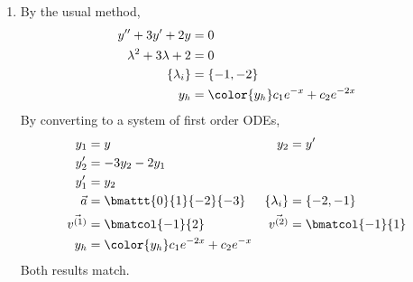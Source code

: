 \begin{enumerate}
    \item By the usual method,
          \begin{align}
              y'' + 3y' + 2y             & = 0                                    \\
              \lambda^{2} + 3\lambda + 2 & = 0                                    \\
              \{\lambda_i\}              & = \{-1, -2\}                           \\
              y_h                        & = \color{y_h} c_1 e^{-x} + c_2 e^{-2x}
          \end{align}
          By converting to a system of first order ODEs,
          \begin{align}
              y_1           & = y                                    & y_2           & = y'              \\
              y_2'          & = -3y_2 - 2y_1                                                             \\
              y_1'          & = y_2                                                                      \\
              \vec{a}       & = \bmattt{0}{1}{-2}{-3}                & \{\lambda_i\} & = \{-2, -1\}      \\
              \vec{v^{(1)}} & = \bmatcol{-1}{2}                      & \vec{v^{(2)}} & = \bmatcol{-1}{1} \\
              y_h           & = \color{y_h} c_1 e^{-2x} + c_2 e^{-x}
          \end{align}
          Both results match.


\end{enumerate}
